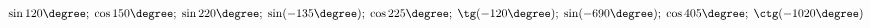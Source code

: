 \begin{ex}[type=calculate]
	\begin{condition}
		\( \sin120\degree;\;\cos150\degree;\;\sin220\degree;\;\sin(-135\degree);\;\cos225\degree;\;\tg(-120\degree);\;\sin(-690\degree);\;\cos405\degree;\;\ctg(-1020\degree) \)
	\end{condition}
\end{ex}